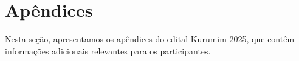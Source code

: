 \section{Apêndices}
    \par Nesta seção, apresentamos os apêndices do edital Kurumim 2025, 
    que contêm informações adicionais relevantes para os participantes.

    
    